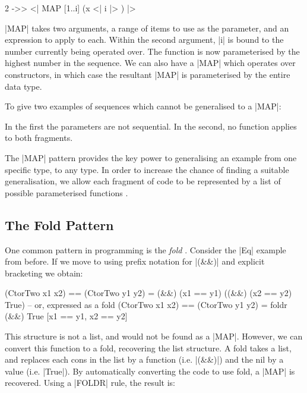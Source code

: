 \documentclass{llncs}
\begin{document}
\begin{code}
2 ->> <| MAP [1..i] (x <| i |> ) |>
\end{code}

|MAP| takes two arguments, a range of items to use as the parameter, and an expression to apply to each. Within the second argument, |i| is bound to the number currently being operated over. The function is now parameterised by the highest number in the sequence. We can also have a |MAP| which operates over constructors, in which case the resultant |MAP| is parameterised by the entire data type.

To give two examples of sequences which cannot be generalised to a |MAP|:

\begin{code}
[1 ->> x <| i |>, 3 ->> x <| i |>]
[1 ->> x <| i |>, 2 ->> y <| i |>]
\end{code}

In the first the parameters are not sequential. In the second, no function applies to both fragments.

The |MAP| pattern provides the key power to generalising an example from one specific type, to any type. In order to increase the chance of finding a suitable generalisation, we allow each fragment of code to be represented by a list of possible parameterised functions \cite{wadler:list_successes}.


\subsection{The Fold Pattern}
\label{sec:fold}

One common pattern in programming is the \textit{fold} \cite{hutton:fold}. Consider the |Eq| example from before. If we move to using prefix notation for |(&&)| and explicit bracketing we obtain:

\begin{code}
(CtorTwo x1 x2) == (CtorTwo y1 y2) = (&&) (x1 == y1) ((&&) (x2 == y2) True)
 -- or, expressed as a fold
(CtorTwo x1 x2) == (CtorTwo y1 y2) = foldr (&&) True [x1 == y1, x2 == y2]
\end{code}

This structure is not a list, and would not be found as a |MAP|. However, we can convert this function to a fold, recovering the list structure. A fold takes a list, and replaces each cons in the list by a function (i.e. |(&&)|) and the nil by a value (i.e. |True|). By automatically converting the code to use fold, a |MAP| is recovered. Using a |FOLDR| rule, the result is:
\end{document}
